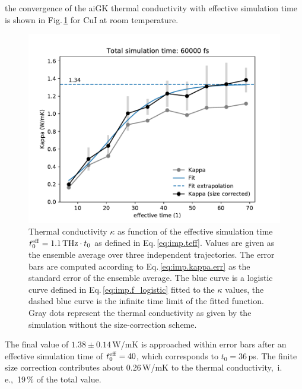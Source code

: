 the convergence of the aiGK thermal conductivity with effective simulation time is shown in Fig.\,\ref{fig:imp.kappa.convergence.CuI} for CuI at room temperature.
\begin{figure}
	\includegraphics[width=\textwidth]{./data/plots/kappa_convergence/examples/216_CuI.pdf}
	\caption{Thermal conductivity $\kappa$ as function of the effective simulation time $t^{\rm eff}_0 = 1.1\,{\rm THz} \cdot t_0$ as defined in Eq.\,\ref{eq:imp.teff}. Values are given as the ensemble average over three independent trajectories. The error bars are computed according to Eq.\,\eqref{eq:imp.kappa.err} as the standard error of the ensemble average. The blue curve is a logistic curve defined in Eq.\,\eqref{eq:imp.f_logistic} fitted to the $\kappa$ values, the dashed blue curve is the infinite time limit of the fitted function. Gray dots represent the thermal conductivity as given by the simulation without the size-correction scheme.
}
	\label{fig:imp.kappa.convergence.CuI}
\end{figure}
The final value of $1.38 \pm 0.14$\,W/mK is approached within error bars after an effective simulation time of $t^{\rm eff}_0 = 40$, which corresponds to $t_0=36$\,ps. The finite size correction contributes about 0.26\,W/mK to the thermal conductivity,~i.\,e.,~19\,\% of the total value.

